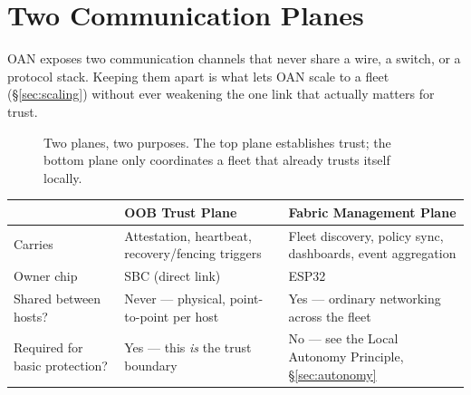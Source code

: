 \documentclass[11pt,a4paper]{article}
\newcommand{\figcap}[1]{\caption{#1}}
\begin{document}
\section{Two Communication Planes}
\label{sec:planes}

OAN exposes two communication channels that never share a wire, a
switch, or a protocol stack. Keeping them apart is what lets OAN scale
to a fleet (\S\ref{sec:scaling}) without ever weakening the one link
that actually matters for trust.

\begin{figure}[h!]
\centering
{}
\figcap{Two planes, two purposes. The top plane establishes trust; the bottom plane only coordinates a fleet that already trusts itself locally.}
\label{fig:planes}
\end{figure}

\begin{center}
\renewcommand{\arraystretch}{1.3}
\begin{tabular}{@{}p{3.6cm}p{4.9cm}p{4.9cm}@{}}
\toprule
 & \textbf{OOB Trust Plane} & \textbf{Fabric Management Plane} \\
\midrule
Carries & Attestation, heartbeat, recovery/fencing triggers & Fleet discovery, policy sync, dashboards, event aggregation \\
Owner chip & SBC (direct link) & ESP32 \\
Shared between hosts? & Never --- physical, point-to-point per host & Yes --- ordinary networking across the fleet \\
Required for basic protection? & Yes --- this \emph{is} the trust boundary & No --- see the Local Autonomy Principle, \S\ref{sec:autonomy} \\
\bottomrule
\end{tabular}
\end{center}
\end{document}
